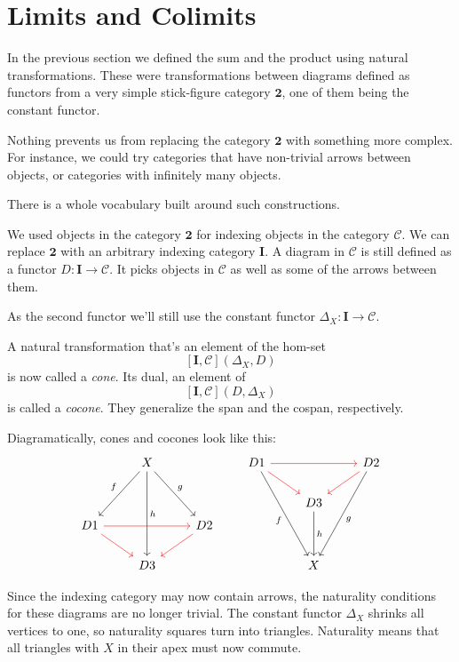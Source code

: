 \documentclass[DaoFP]{subfiles}
\begin{document}
\section{Limits and Colimits}

In the previous section we defined the sum and the product using natural transformations. These were transformations between diagrams defined as functors from a very simple stick-figure category $\mathbf{2}$, one of them being the constant functor. 

Nothing prevents us from replacing the category $\mathbf{2}$ with something more complex. For instance, we could try categories that have non-trivial arrows between objects, or categories with infinitely many objects. 

There is a whole vocabulary built around such constructions. 

We used objects in the category $\mathbf{2}$ for indexing objects in the category $\mathcal{C}$. We can replace $\mathbf{2}$ with an arbitrary indexing category $\mathbf{I}$. A diagram in $\mathcal{C}$ is still defined as a functor $D \colon \mathbf{I} \to \mathcal{C}$. It picks objects in $\mathcal{C}$ as well as some of the arrows between them.

As the second functor we'll still use the constant functor $\Delta_X \colon \mathbf{I} \to \mathcal{C}$.

A  natural transformation that's an element of the hom-set
\[ [\mathbf{I}, \mathcal{C}](\Delta_X, D)  \]
is now called a \emph{cone}. Its dual, an element of
\[ [\mathbf{I}, \mathcal{C}](D, \Delta_X)  \]
is called a \emph{cocone}. They generalize the span and the cospan, respectively.

Diagramatically, cones and cocones look like this:
\[
 \begin{tikzcd}
  & X
\arrow[ddr, "g"]
 \arrow[ddl, "f"']
 \arrow[ddd, "h"]
 \\
\\
D 1 
\arrow[rr, red]
\arrow[rd, red]
&& D 2
\arrow[dl, red]
\\
& D 3
 \end{tikzcd}
 \qquad
\begin{tikzcd}
 D 1
 \arrow[rr, red]
 \arrow[dr, red]
 \arrow[dddr, "f"']
 && D 2
\arrow[dl, red]
 \arrow[dddl, "g"]
 \\
 & D 3
 \arrow[dd, "h"]
 \\
 \\
 & X
 \end{tikzcd}
 \]

Since the indexing category may now contain arrows, the naturality conditions for these diagrams are no longer trivial. The constant functor $\Delta_X$ shrinks all vertices to one, so naturality squares turn into triangles. Naturality means that all triangles with $X$ in their apex must now commute. 
\end{document}
